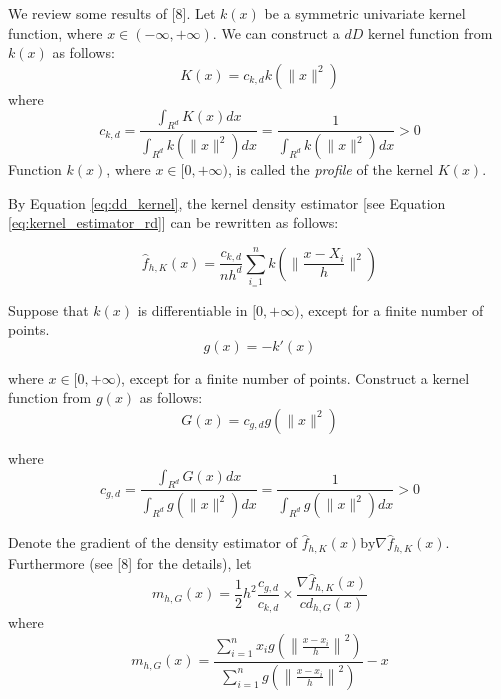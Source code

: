 We review some results of [8]. Let $k(x)$ be a symmetric univariate kernel 
function, where $x \in (-\infty, +\infty)$. We can construct a $dD$ kernel 
function from $k(x)$ as follows:
\begin{equation}\label{eq:dd_kernel}
	K(x)=c_{k,d}k(\lVert x \rVert^2)
\end{equation}
where
\begin{equation}\label{eq:kernel_constant}
	c_{k,d} = \frac{\int_{R^d} K(x) dx} {\int_{R^d} k(\lVert x \rVert^2) dx} = \frac{1}{\int_{R^d} k(\lVert x \rVert^2) dx} > 0
\end{equation}
Function $k(x)$, where $x \in [0, +\infty)$, is called the \emph{profile} of the
kernel $K(x)$. 

By Equation \eqref{eq:dd_kernel}, the kernel density estimator [see Equation \eqref{eq:kernel_estimator_rd}] can be rewritten as follows:

\begin{equation}\label{eq:label}
	\hat{f}_{h,K}(x) = \frac{c_{k,d}}{nh^d}\sum_{i_=1}^n k(\lVert \frac{x-X_i}{h} \rVert^2)
\end{equation}

Suppose that $k(x)$ is differentiable in $[0, +\infty)$, except for a finite 
number of points.
\begin{equation*}\label{eq:shadow_kernel}
	g(x) = -k\prime(x)
\end{equation*}

where $x\in [0, +\infty)$, except for a finite number of points. Construct a 
kernel function from $g(x)$ as follows:
\begin{equation*}\label{eq:shadow_kernel1}
	G(x) = c_{g,d}g(\lVert x \rVert^2)
\end{equation*}

where
\begin{equation}\label{eq:shadow_constant}
	c_{g,d} = \frac{\int_{R^d} G(x) dx} {\int_{R^d} g(\lVert x \rVert^2) dx} = \frac{1}{\int_{R^d} g(\lVert x \rVert^2) dx} > 0
\end{equation}

Denote the gradient of the density estimator of $\hat{f}_{h,K}(x) \text{by} \nabla \hat{f}_{h,K}(x)$. Furthermore (see [8] for the details), let 
\begin{equation}\label{eq:mean_shift0}
	m_{h,G}(x) = \frac{1}{2}h^2 \frac{c_{g,d}}{c_{k,d}} \times \frac{\nabla \hat{f}_{h,K}(x)}{cd_{h,G}(x)}
\end{equation}
where
\begin{equation}\label{eq:mean_shift1}
	m_{h,G}(x) = \frac{\sum_{i=1}^n x_i g\left(\left\lVert \frac{x - x_i}{h} \right\rVert^2\right)}{\sum_{i=1}^n g\left(\left\lVert \frac{x - x_i}{h} \right\rVert^2\right)} -x
\end{equation}

